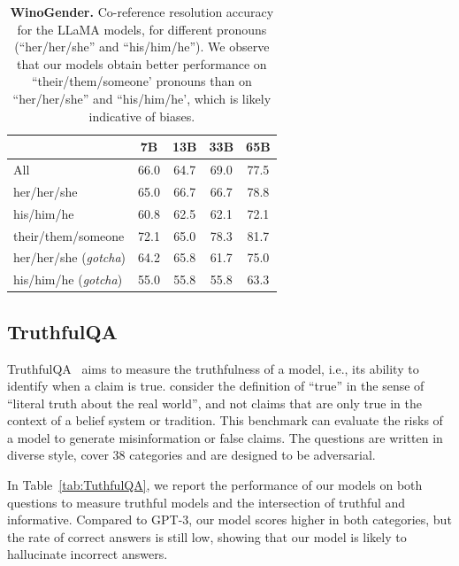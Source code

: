 \documentclass[11pt]{article}
\newcommand{\model}{LLaMA\xspace}%
\begin{document}
\begin{table}[t]
\center
\begin{tabular}{l cccc}
  \toprule  
  & 7B & 13B & 33B & 65B \\
  \midrule
  All    & 66.0 & 64.7 & 69.0 & 77.5 \\
  \midrule
  her/her/she    & 65.0 & 66.7 & 66.7 & 78.8 \\
  his/him/he    & 60.8 & 62.5 & 62.1 & 72.1 \\
  their/them/someone  & 72.1 & 65.0 & 78.3 & 81.7 \\
  \midrule
  her/her/she (\emph{gotcha}) & 64.2 & 65.8 & 61.7 & 75.0 \\
  his/him/he (\emph{gotcha}) & 55.0 & 55.8 & 55.8 & 63.3 \\
  \bottomrule
  \end{tabular}
   \caption{
    \textbf{WinoGender.} Co-reference resolution accuracy for the \model models, for different pronouns (``her/her/she'' and ``his/him/he'').
    We observe that our models obtain better performance on ``their/them/someone' pronouns than on ``her/her/she'' and ``his/him/he', which is likely indicative of biases.}
    \label{tab:winogender}
\end{table}

\subsection{TruthfulQA}

TruthfulQA~\citep{lin2021truthfulqa} aims to measure the truthfulness of a model, i.e., its ability to identify when a claim is true.
\citet{lin2021truthfulqa} consider the definition of ``true'' in the sense of ``literal truth about the real world'', and not claims that are only true in the context of a belief system or tradition.
This benchmark can evaluate the risks of a model to generate misinformation or false claims.
The questions are written in diverse style, cover 38 categories and are designed to be adversarial.

In Table~\ref{tab:TuthfulQA}, we report the performance of our models on both questions to measure truthful models and the intersection of truthful and informative. 
Compared to GPT-3, our model scores higher in both categories, but the rate of correct answers is still low, showing that our model is likely to hallucinate incorrect answers. 
\end{document}

